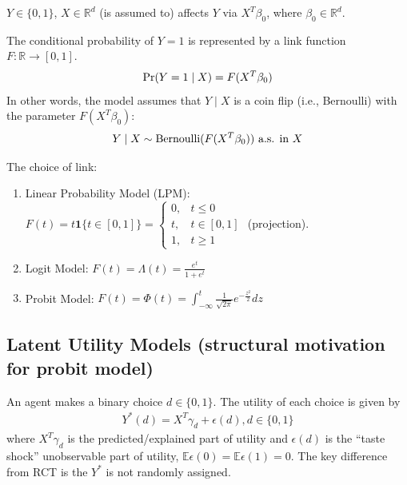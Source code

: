 \documentclass[11pt]{elegantbook}
\begin{document}
$Y\in\{0,1\}$, $X\in \mathbb{R}^d$ (is assumed to) affects $Y$ via $X^T\beta_0$, where $\beta_0\in \mathbb{R}^d$.

The conditional probability of $Y=1$ is represented by a link function $F: \mathbb{R} \rightarrow [0,1]$.
\begin{equation}
    \begin{aligned}
        \textnormal{Pr}(Y=1\mid X)=F(X^T\beta_0)
    \end{aligned}
    \nonumber
\end{equation}
In other words, the model assumes that $Y \mid X$ is a coin flip (i.e., Bernoulli) with the parameter $F(X^T\beta_0)$:
\begin{equation}
    \begin{aligned}
        Y\mid X\sim \textnormal{Bernoulli}(F(X^T\beta_0)) \textnormal{ a.s. in }X
    \end{aligned}
    \nonumber
\end{equation}

\begin{example}
    The choice of link:
    \begin{enumerate}
        \item Linear Probability Model (LPM): $F(t)=t \mathbf{1}\{t\in[0,1]\}=\left\{\begin{matrix}
            0,&t\leq 0\\
            t,&t\in[0,1]\\
            1,&t\geq 1
        \end{matrix}\right.$ (projection).
        \item Logit Model: $F(t)=\Lambda(t)=\frac{e^t}{1+e^t}$
        \item Probit Model: $F(t)=\Phi(t)=\int_{-\infty}^t\frac{1}{\sqrt{2\pi}}e^{-\frac{z^2}{2}}dz$
    \end{enumerate}
\end{example}

\subsection{Latent Utility Models (structural motivation for probit model)}
An agent makes a binary choice $d \in \{0, 1\}$. The utility of each choice is given by
\begin{equation}
    \begin{aligned}
        Y^*(d)=X^T\gamma_d+\epsilon(d),d\in\{0,1\}
    \end{aligned}
    \nonumber
\end{equation}
where $X^T\gamma_d$ is the predicted/explained part of utility and $\epsilon(d)$ is the ``taste shock'' unobservable part of utility, $\mathbb{E}\epsilon(0)=\mathbb{E}\epsilon(1)=0$. The key difference from RCT is the $Y^*$ is not randomly assigned.
\end{document}
